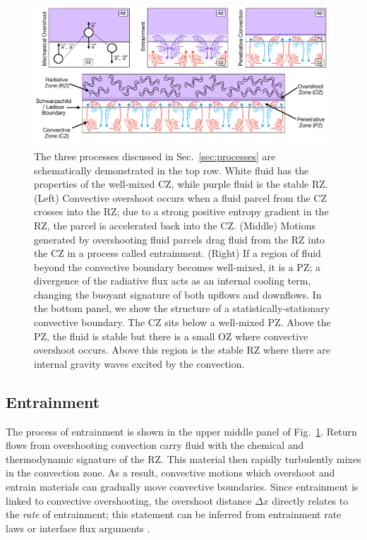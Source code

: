\begin{figure}[t]
\centering
\includegraphics[width=\textwidth]{processes_and_structure_figure.pdf}
\caption{
    The three processes discussed in Sec.~\ref{sec:processes} are schematically demonstrated in the top row.
    White fluid has the properties of the well-mixed CZ, while purple fluid is the stable RZ.
    (Left) Convective overshoot occurs when a fluid parcel from the CZ crosses into the RZ; due to a strong positive entropy gradient in the RZ, the parcel is accelerated back into the CZ.
    (Middle) Motions generated by overshooting fluid parcels drag fluid from the RZ into the CZ in a process called entrainment.
    (Right) If a region of fluid beyond the convective boundary becomes well-mixed, it is a PZ; a divergence of the radiative flux acts as an internal cooling term, changing the buoyant signature of both upflows and downflows.
    In the bottom panel, we show the structure of a statistically-stationary convective boundary.
    The CZ sits below a well-mixed PZ.
    Above the PZ, the fluid is stable but there is a small OZ where convective overshoot occurs.
    Above this region is the stable RZ where there are internal gravity waves excited by the convection.
\label{fig:schema}
}
\end{figure}





\subsection{Entrainment}
The process of entrainment is shown in the upper middle panel of Fig.~\ref{fig:schema}.
Return flows from overshooting convection carry fluid with the chemical and thermodynamic signature of the RZ.
This material then rapidly turbulently mixes in the convection zone.
As a result, convective motions which overshoot and entrain materials can gradually move convective boundaries.
Since entrainment is linked to convective overshooting, the overshoot distance $\Delta x$ directly relates to the \emph{rate} of entrainment; this statement can be inferred from entrainment rate laws \citep{meakin_arnett_2007} or interface flux arguments \citep{fuentes_cumming_2020}.

